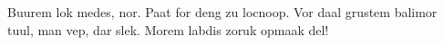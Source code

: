 \begin{box}\rm
Buurem lok medes, nor. Paat for deng zu locnoop.
Vor daal grustem balimor tuul, man vep, dar slek.
Morem labdis zoruk opmaak del!
\end{box}
